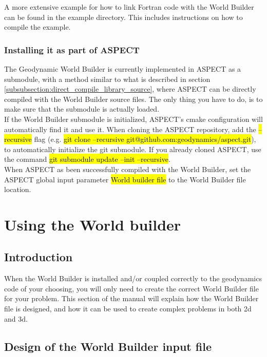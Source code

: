 \documentclass{book}
\newcommand{\GWB}{{Geodynamic World Builder}}
\newcommand{\WB}{{World Builder}}
\newcommand{\aspect}{{ASPECT}}
\newcommand{\cmake}{{cmake}}
\begin{document}
A more extensive example for how to link Fortran code with the \WB{} can be found in the example directory. This includes instructions on how to compile the example.

\subsection{Installing it as part of ASPECT}
The \GWB{} is currently implemented in \aspect{} as a submodule, with a method similar to what is described in section \ref{subsubsection:direct_compile_library_source}, where ASPECT can be directly compiled with the \WB{} source files. The only thing you have to do, is to make sure that the submodule is actually loaded.
\\
 If the \WB{} submodule is initialized, \aspect{}'s \cmake{} configuration will automatically find it and use it. When cloning the \aspect{} repository, add the \hl{--recursive} flag (e.g. \hl{git clone --recursive git@github.com:geodynamics/aspect.git}), to automatically initialize the git submodule. If you already cloned \aspect{}, use the command \hl{git submodule update --init --recursive}. 
 \\
 When \aspect{} as been successfully compiled with the \WB{}, set the \aspect{} global input parameter \hl{World builder file} to the \WB{} file location. 


\chapter{Using the World builder}
\section{Introduction}
When the \WB{} is installed and/or coupled correctly to the geodynamics code of your choosing, you will only need to create the correct \WB{} file for your problem. This section of the manual will explain how the \WB{} file is designed, and how it can be used to create complex problems in both 2d and 3d. 
\section{Design of the \WB{} input file}
\end{document}
